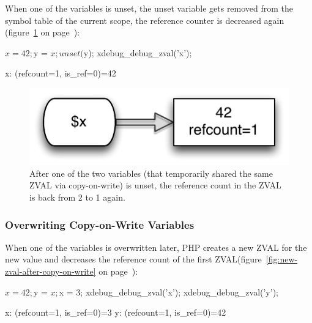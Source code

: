 When one of the variables is unset, the unset variable gets removed from the symbol table of the current scope, the reference counter is decreased again (figure~\ref{fig:reference-count-decreased} on page~\pageref{fig:reference-count-decreased}):

\begin{phpcode}
$x = 42;
$y = $x;
unset($y);
xdebug_debug_zval('x');
\end{phpcode}

\begin{textcode}
x: (refcount=1, is_ref=0)=42
\end{textcode}

\begin{figure}[htb]
  \begin{center}
    \includegraphics[scale=0.8]{images/x_42}
    \caption{After one of the two variables (that temporarily shared the same ZVAL via copy-on-write) is unset, the reference count in the ZVAL is back from 2 to 1 again.}
    \label{fig:reference-count-decreased}
  \end{center}
\end{figure}


\subsubsection{Overwriting Copy-on-Write Variables}
\label{sec:overwriting}

When one of the variables is overwritten later, PHP creates a new ZVAL for the new value and decreases the reference count of the first ZVAL(figure~\ref{fig:new-zval-after-copy-on-write} on page~\pageref{fig:new-zval-after-copy-on-write}):

\begin{phpcode}
$x = 42;
$y = $x;
$x = 3;
xdebug_debug_zval('x');
xdebug_debug_zval('y');
\end{phpcode}

\begin{textcode}
x: (refcount=1, is_ref=0)=3
y: (refcount=1, is_ref=0)=42
\end{textcode}

